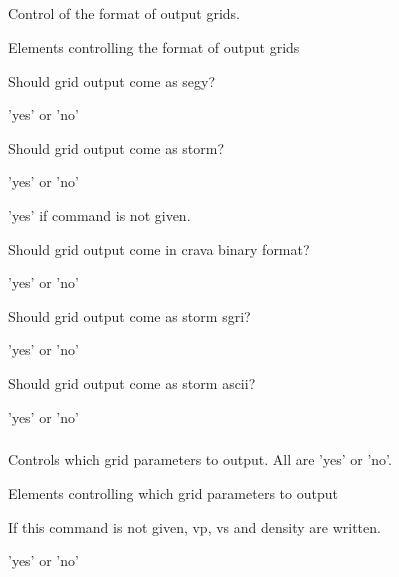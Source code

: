 \subparagraph{}
 \slist
   \item \Description Control of the format of output grids.
   \item \Argument Elements controlling the format of output grids
   \item \Default
 \elist

 \slist
   \item \Description Should grid output come as segy?
   \item \Argument 'yes' or 'no'
   \item \Default
 \elist

 \slist
   \item \Description Should grid output come as storm?
   \item \Argument 'yes' or 'no'
   \item \Default 'yes' if  command is not given.
 \elist


 \slist
   \item \Description Should grid output come in crava binary format?
   \item \Argument 'yes' or 'no'
   \item \Default
 \elist

 \slist
   \item \Description Should grid output come as storm sgri?
   \item \Argument 'yes' or 'no'
   \item \Default
 \elist

 \slist
   \item \Description Should grid output come as storm ascii?
   \item \Argument 'yes' or 'no'
   \item \Default
 \elist

\subparagraph{}
 \slist
   \item \Description Controls which grid parameters to output. All are 'yes' or 'no'.
   \item \Argument Elements controlling which grid parameters to output
   \item \Default If this command is not given, vp, vs and density are written.
 \elist

 \slist
   \item \Description
   \item \Argument 'yes' or 'no'
   \item \Default
 \elist

